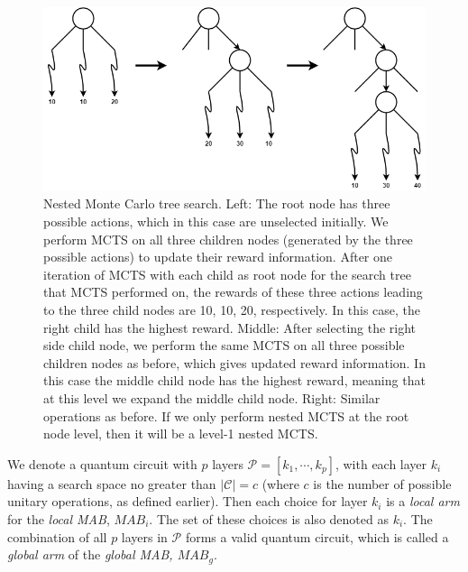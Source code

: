 \documentclass{ieeeaccess}
\begin{document}
  \begin{figure}[H]
    \centering
    \includegraphics[width=0.8\linewidth]{peiyong_fig_4.png}
    \caption{Nested Monte Carlo tree search. Left: The root node has three possible actions, which in this case are unselected initially. We perform MCTS on all three children nodes (generated by the three possible actions) to update their reward information. After one iteration of MCTS with each child as root node for the search tree that MCTS performed on, the rewards of these three actions leading to the three child nodes are 10, 10, 20, respectively. In this case, the right child has the highest reward. Middle: After selecting the right side child node, we perform the same MCTS on all three possible children nodes as before, which gives updated reward information. In this case the middle child node has the highest reward, meaning that at this level we expand the middle child node. Right: Similar operations as before. If we only perform nested MCTS at the root node level, then it will be a level-1 nested MCTS.}
    \label{fig:nestedmcts}
  \end{figure}
  
  
  
  We denote a quantum circuit with $p$ layers $\mathcal{P} = [k_1,\cdots, k_p]$, with each layer $k_i$ having a search space no greater than $\vert \mathcal{C} \vert = c$ (where $c$ is the number of possible unitary operations, as defined earlier). Then each choice for layer $k_i$ is a \textit{local arm} for the \textit{local MAB}, $MAB_i$. The set of these choices is also denoted as $k_i$. The combination of all $p$ layers in $\mathcal{P}$ forms a valid quantum circuit, which is called a \textit{global arm} of the \textit{global MAB, $MAB_g$}. 
  
\end{document}
